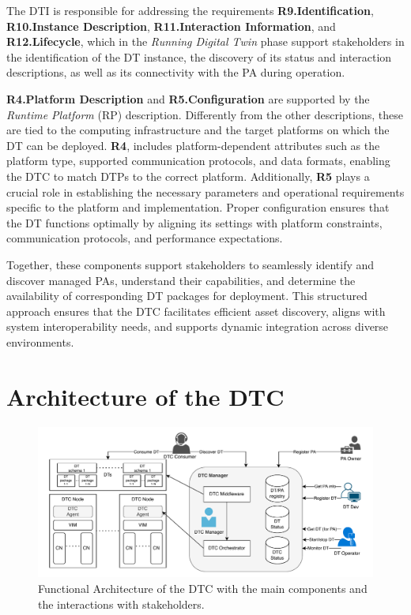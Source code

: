The DTI is responsible for addressing the requirements \textbf{R9.Identification}, \textbf{R10.Instance\- Description}, \textbf{R11.Interaction\- Information}, and \textbf{R12.Life\-cycle}, which in the \emph{Running Digital Twin} phase support stakeholders in the identification of the DT instance, the discovery of its status and interaction descriptions, as well as its connectivity with the \ac{PA} during operation.


\textbf{R4.Platform Description} and \textbf{R5.Configuration} are supported by the \textit{Runtime Platform} (RP) description.
%
Differently from the other descriptions, these are tied to the computing infrastructure and the target platforms on which the \ac{DT} can be deployed. 
%
\textbf{R4}, includes platform-dependent attributes such as the platform type, supported communication protocols, and data formats, enabling the DTC to match DTPs to the correct platform.
%
Additionally, \textbf{R5} plays a crucial role in establishing the necessary parameters and operational requirements specific to the platform and implementation. Proper configuration ensures that the DT functions optimally by aligning its settings with platform constraints, communication protocols, and performance expectations.  

Together, these components support stakeholders to seamlessly identify and discover managed \acp{PA}, understand their capabilities, and determine the availability of corresponding \ac{DT} packages for deployment. This structured approach ensures that the DTC facilitates efficient asset discovery, aligns with system interoperability needs, and supports dynamic integration across diverse environments. 

\section{Architecture of the \acl{DTC}}

\begin{figure}
    \centering
    \includegraphics[width=\textwidth]{figures/dtc/architecture_new_v2.pdf}
    \caption{Functional Architecture of the \ac{DTC} with the main components and the interactions with stakeholders.}
    \label{fig:dtc-architecture}
\end{figure}

